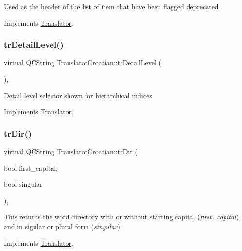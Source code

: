 Used as the header of the list of item that have been flagged deprecated 

Implements \mbox{\hyperlink{class_translator}{Translator}}.

\mbox{\label{class_translator_croatian_a8c51d43d261f6bdac4ad89305a51439e}} 
\subsubsection{\texorpdfstring{trDetailLevel()}{trDetailLevel()}}
{\footnotesize\ttfamily virtual \mbox{\hyperlink{class_q_c_string}{Q\+C\+String}} Translator\+Croatian\+::tr\+Detail\+Level (\begin{DoxyParamCaption}{ }\end{DoxyParamCaption})\hspace{0.3cm}{\ttfamily [inline]}, {\ttfamily [virtual]}}

Detail level selector shown for hierarchical indices 

Implements \mbox{\hyperlink{class_translator}{Translator}}.

\mbox{\label{class_translator_croatian_a10a3224ece15bbb3004ae9ec02fc2335}} 
\subsubsection{\texorpdfstring{trDir()}{trDir()}}
{\footnotesize\ttfamily virtual \mbox{\hyperlink{class_q_c_string}{Q\+C\+String}} Translator\+Croatian\+::tr\+Dir (\begin{DoxyParamCaption}\item[{bool}]{first\+\_\+capital,  }\item[{bool}]{singular }\end{DoxyParamCaption})\hspace{0.3cm}{\ttfamily [inline]}, {\ttfamily [virtual]}}

This returns the word directory with or without starting capital ({\itshape first\+\_\+capital}) and in sigular or plural form ({\itshape singular}). 

Implements \mbox{\hyperlink{class_translator}{Translator}}.

